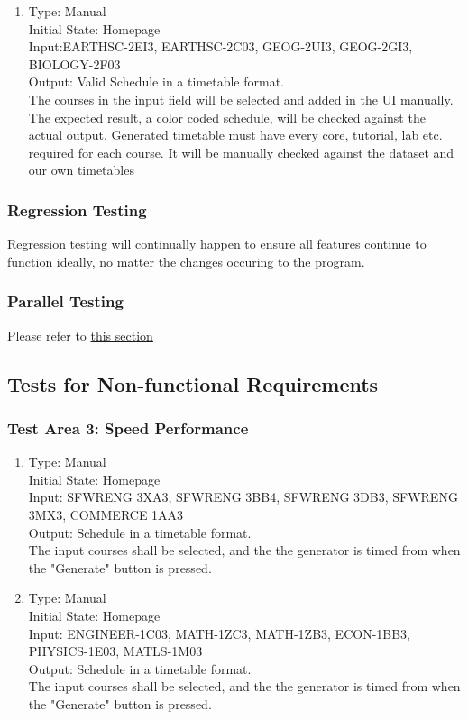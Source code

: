 \documentclass[11pt, oneside]{article}   	%
\begin{document}
\begin{enumerate}
\item Type: Manual \\
Initial State: Homepage \\
Input:EARTHSC-2EI3, EARTHSC-2C03, GEOG-2UI3, GEOG-2GI3, BIOLOGY-2F03\\
Output: Valid Schedule in a timetable format. \\
The courses in the input field will be selected and added in the UI manually. The expected result, a color coded schedule, will be checked against the actual output. Generated timetable must have every core, tutorial, lab etc. required for each course. It will be manually checked against the dataset and our own timetables \\
\end{enumerate}

\subsubsection{Regression Testing}
Regression testing will continually happen to ensure all features continue to function ideally, no matter the changes occuring to the program.

\subsubsection{Parallel Testing}
Please refer to \hyperref[sec:compare]{this section}

\subsection{Tests for Non-functional Requirements}
\subsubsection{Test Area 3: Speed Performance}
\begin{enumerate}

\item Type: Manual \\
Initial State: Homepage \\
Input: SFWRENG 3XA3, SFWRENG 3BB4, SFWRENG 3DB3, SFWRENG 3MX3, COMMERCE 1AA3 \\
Output: Schedule in a timetable format. \\
The input courses shall be selected, and the the generator is timed from when the "Generate" button is pressed. \\

\item Type: Manual \\
Initial State: Homepage \\
Input:  ENGINEER-1C03, MATH-1ZC3, MATH-1ZB3,  ECON-1BB3, PHYSICS-1E03, MATLS-1M03 \\
Output: Schedule in a timetable format. \\
The input courses shall be selected, and the the generator is timed from when the "Generate" button is pressed.  \\
\end{enumerate}
\end{document}
